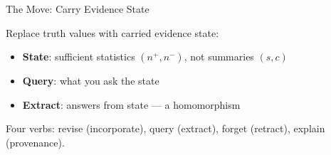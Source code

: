 \documentclass[aspectratio=169,11pt]{beamer}
\begin{document}
\begin{frame}{The Move: Carry Evidence State}

Replace truth values with \alert{carried evidence state}:
\begin{itemize}
\item \textbf{State}: sufficient statistics $(n^+, n^-)$, not summaries $(s, c)$
\item \textbf{Query}: what you ask the state
\item \textbf{Extract}: answers from state --- a \alert{homomorphism}
\end{itemize}

\medskip
\begin{center}
\end{center}

\medskip
Four verbs: \alert{revise} (incorporate), \alert{query} (extract),
\alert{forget} (retract), \alert{explain} (provenance).

\end{frame}
\end{document}

